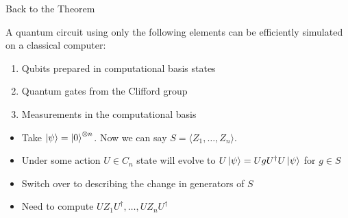 \documentclass[11pt,aspectratio=1610]{beamer}
\begin{document}
\begin{frame}{Back to the Theorem}
	\begin{theorem}
		A quantum circuit using only the following elements can be efficiently simulated on a classical computer:
		\begin{enumerate}
			\item Qubits prepared in computational basis states
			\item Quantum gates from the Clifford group
			\item Measurements in the computational basis
		\end{enumerate}
	\end{theorem}
	\begin{itemize}
		\item Take $\ket{\psi} = \ket{0}^{\otimes n}$. Now we can say $S = \langle Z_1, \ldots, Z_n\rangle$.
		\item Under some action $U\in C_n$ state will evolve to $U\ket{\psi} = UgU^\dagger U\ket{\psi}$ for $g\in S$
		\item Switch over to describing the change in generators of $S$
		\item Need to compute $UZ_1U^\dagger,\ldots, UZ_nU^\dagger$
	\end{itemize}

\end{frame}
\end{document}
